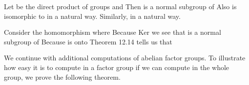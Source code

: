 \documentclass[11pt,oneside]{article}
\begin{document}
\begin{BookBody}
 Let  be the direct product of groups  and  Then  is a normal subgroup of  Also  is isomorphic to  in a natural way. Similarly,  in a natural way.

 Consider the homomorphism  where  Because Ker  we see that  is a normal subgroup of  Because  is onto  Theorem 12.14 tells us that \BookEnd{\blacklozenge}

We continue with additional computations of abelian factor groups. To illustrate how easy it is to compute in a factor group if we can compute in the whole group, we prove the following theorem.

\end{BookBody}

\BookNarrativetrue
\end{document}
